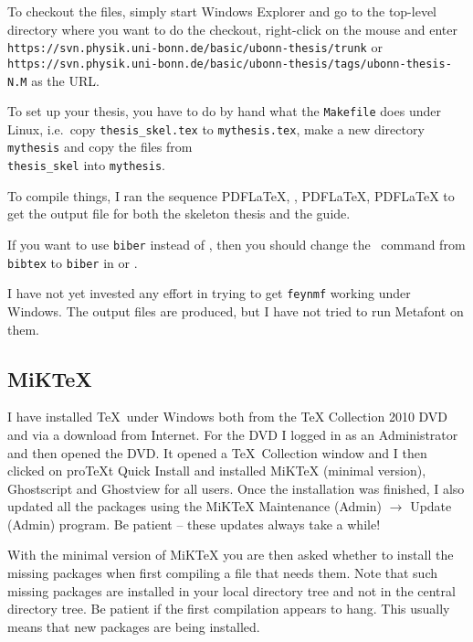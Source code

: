 To checkout the files, simply start Windows Explorer and go to the
top-level directory where you want to do the checkout, right-click on
the mouse and enter\\
\texttt{https://svn.physik.uni-bonn.de/basic/ubonn-thesis/trunk} or\\
\texttt{https://svn.physik.uni-bonn.de/basic/ubonn-thesis/tags/ubonn-thesis-N.M}
as the URL.

To set up your thesis, you have to do by hand what the
\texttt{Makefile} does under Linux, i.e.\ copy \texttt{thesis\_skel.tex}
to \texttt{mythesis.tex}, make a new directory \texttt{mythesis} and
copy the files from\\
\texttt{thesis\_skel} into \texttt{mythesis}.

To compile things, I ran the sequence PDF\LaTeX, \BibTeX, PDF\LaTeX,
PDF\LaTeX{} to get the output file for both the skeleton thesis and
the guide.

If you want to use \texttt{biber} instead of \BibTeX, then you should
change the \BibTeX\ command from \texttt{bibtex} to \texttt{biber} in
\TeXstudio or \TeXworks.

I have not yet invested any effort in trying to get \texttt{feynmf}
working under Windows. The output files are produced, but I have not
tried to run Metafont on them.


\subsection{MiK\TeX}
\label{sec:app:miktex}

I have installed \TeX\ under Windows both from the \TeX{} Collection
2010 DVD and via a download from Internet. For the DVD I logged in as
an Administrator and then opened the DVD. It opened a \TeX\ Collection
window and I then clicked on pro\TeX t Quick Install and installed
MiK\TeX{} (minimal version),
Ghostscript and Ghostview for all
users. Once the installation was finished, I also updated all the
packages using the MiK\TeX{} Maintenance (Admin) $\to$ Update (Admin)
program. Be patient -- these updates always take a while!

With the minimal version of MiK\TeX{} you are then asked whether to
install the missing packages when first compiling a file that needs
them. Note that such missing packages are installed in your local
directory tree and not in the central directory tree. Be patient if
the first compilation appears to hang. This usually means that new
packages are being installed.

